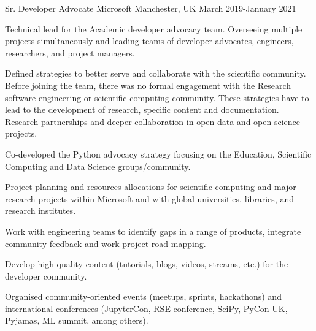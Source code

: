 \begin{cventries}
\cventry
{Sr. Developer Advocate} %
{Microsoft} %
{Manchester, UK} %
{March 2019-January 2021 } %
{ %
\begin{cvitems}
\item {Technical lead for the Academic developer advocacy team. Overseeing multiple projects simultaneously and leading teams of developer advocates, engineers, researchers,  and project managers.}
\item {Defined strategies to better serve and collaborate with the scientific community. Before joining the team, there was no formal engagement with the Research software engineering or scientific computing community. These strategies have to lead to the development of research, specific content and documentation. Research partnerships and deeper collaboration in open data and open science projects.}
\item {Co-developed the Python advocacy strategy focusing on the Education, Scientific Computing and Data Science groups/community.}
\item{Project planning and resources allocations for scientific computing and major research projects within Microsoft and with global universities, libraries, and research institutes. }
\item {Work with engineering teams to identify gaps in a range of products, integrate community feedback and work project road mapping.}
\item {Develop high-quality content (tutorials, blogs, videos, streams, etc.) for the developer community.}
\item {Organised community-oriented events (meetups, sprints, hackathons) and international conferences (JupyterCon, RSE conference, SciPy, PyCon UK, Pyjamas, ML summit, among others).}
\end{cvitems}
}



\end{cventries}
